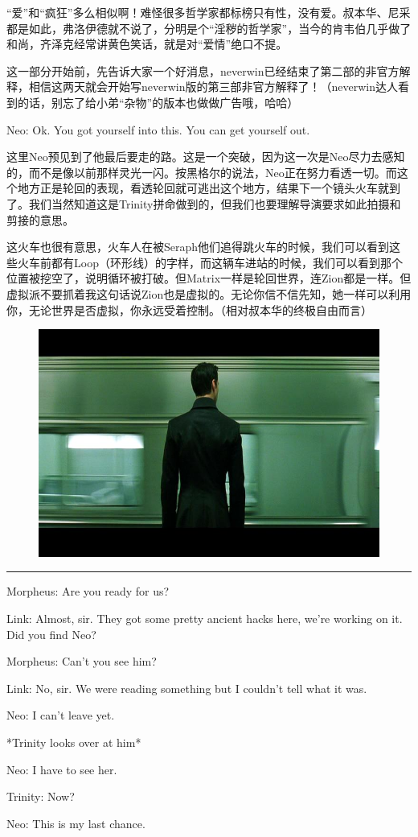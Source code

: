 \documentclass[UTF8]{ctexart}
\newcommand{\myparsep}{\noindent \rule[0.5ex]{\linewidth}{1pt}}
\newenvironment{myquote}{\color{green} \setlength{\leftskip}{6em} \setlength{\rightskip}{4em} \setlength{\parindent}{-2em}}{\par}
\begin{document}
“爱”和“疯狂”多么相似啊！难怪很多哲学家都标榜只有性，没有爱。叔本华、尼采都是如此，弗洛伊德就不说了，分明是个“淫秽的哲学家”，当今的肯韦伯几乎做了和尚，齐泽克经常讲黄色笑话，就是对“爱情”绝口不提。

这一部分开始前，先告诉大家一个好消息，neverwin已经结束了第二部的非官方解释，相信这两天就会开始写neverwin版的第三部非官方解释了！（neverwin达人看到的话，别忘了给小弟“杂物”的版本也做做广告哦，哈哈）

\begin{myquote}
Neo: Ok. You got yourself into this. You can get yourself out.
\end{myquote}

这里Neo预见到了他最后要走的路。这是一个突破，因为这一次是Neo尽力去感知的，而不是像以前那样灵光一闪。按黑格尔的说法，Neo正在努力看透一切。而这个地方正是轮回的表现，看透轮回就可逃出这个地方，结果下一个镜头火车就到了。我们当然知道这是Trinity拼命做到的，但我们也要理解导演要求如此拍摄和剪接的意思。

这火车也很有意思，火车人在被Seraph他们追得跳火车的时候，我们可以看到这些火车前都有Loop（环形线）的字样，而这辆车进站的时候，我们可以看到那个位置被挖空了，说明循环被打破。但Matrix一样是轮回世界，连Zion都是一样。但虚拟派不要抓着我这句话说Zion也是虚拟的。无论你信不信先知，她一样可以利用你，无论世界是否虚拟，你永远受着控制。（相对叔本华的终极自由而言）

\begin{figure}[htb]
\centering
\includegraphics[width=0.5\linewidth]{fig/926a29387d14c524b8998fe3.jpg}
\end{figure}

\myparsep

\begin{myquote}
Morpheus: Are you ready for us?

Link: Almost, sir. They got some pretty ancient hacks here, we're working on it. Did you find Neo?

Morpheus: Can't you see him?

Link: No, sir. We were reading something but I couldn't tell what it was.

Neo: I can't leave yet.

*Trinity looks over at him*

Neo: I have to see her.

Trinity: Now?

Neo: This is my last chance.
\end{myquote}
\end{document}
